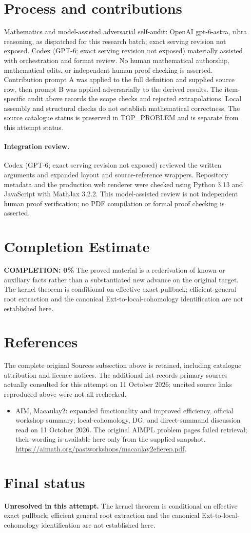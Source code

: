 \documentclass[11pt]{article}
\begin{document}
\section{Process and contributions}
Mathematics and model-assisted adversarial self-audit: OpenAI gpt-6-astra, ultra reasoning, as dispatched for this research batch; exact serving revision not exposed. Codex (GPT-6; exact serving revision not exposed) materially assisted with orchestration and format review. No human mathematical authorship, mathematical edits, or independent human proof checking is asserted.
Contribution prompt A was applied to the full definition and supplied source row, then prompt B was applied adversarially to the derived results. The item-specific audit above records the scope checks and rejected extrapolations. Local assembly and structural checks do not establish mathematical correctness. The source catalogue status is preserved in TOP\_PROBLEM and is separate from this attempt status.
\paragraph{Integration review.} Codex (GPT-6; exact serving revision not exposed) reviewed the written arguments and expanded layout and source-reference wrappers. Repository metadata and the production web renderer were checked using Python 3.13 and JavaScript with MathJax 3.2.2. This model-assisted review is not independent human proof verification; no PDF compilation or formal proof checking is asserted.

\section{Completion Estimate}
\noindent\textbf{COMPLETION: 0\%}
The proved material is a rederivation of known or auxiliary facts rather than a substantiated new advance on the original target. The kernel theorem is conditional on effective exact pullback; efficient general root extraction and the canonical Ext-to-local-cohomology identification are not established here.
\section{References}
The complete original Sources subsection above is retained, including catalogue attribution and licence notices. The additional list records primary sources actually consulted for this attempt on 11 October 2026; uncited source links reproduced above were not all rechecked.
\begin{itemize}
\item AIM, Macaulay2: expanded functionality and improved efficiency, official workshop summary; local-cohomology, DG, and direct-summand discussion read on 11 October 2026. The original AIMPL problem pages failed retrieval; their wording is available here only from the supplied snapshot. \url{https://aimath.org/pastworkshops/macaulay2efierep.pdf}.
\end{itemize}
\section{Final status}
\textbf{Unresolved in this attempt.} The kernel theorem is conditional on effective exact pullback; efficient general root extraction and the canonical Ext-to-local-cohomology identification are not established here.
\end{document}
